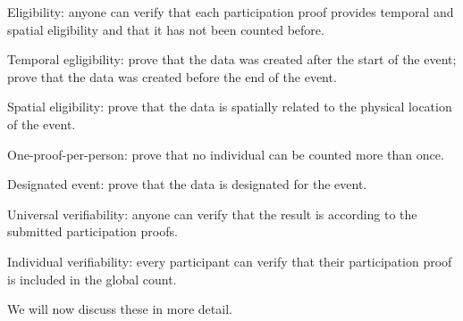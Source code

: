 \begin{requirements}[V]
  \item\label{EligibilityVerif} Eligibility: anyone can verify that each 
    participation proof provides temporal and spatial eligibility and that it 
    has not been counted before.
    \begin{requirements}
    \item Temporal egligibility:%
      \label{CreatedAfterStart} prove that the data was created after the start of 
      the event;%
      \label{CreatedBeforeEnd} prove that the data was created before the end of 
      the event.
    \item Spatial eligibility:%
      \label{SpatiallyRelated} prove that the data is spatially related to the 
      physical location of the event.
    \item One-proof-per-person:%
      \label{CountOnce} prove that no individual can be counted more than once.
    \item Designated event:%
      \label{DesignatedEvent} prove that the data is designated for the event.
    \end{requirements}

  \item\label{UniversalVerif} Universal verifiability: anyone can verify that the 
    result is according to the submitted participation proofs.
  \item\label{IndividualVerif} Individual verifiability: every participant can 
    verify that their participation proof is included in the global count.
\end{requirements}
We will now discuss these in more detail.


